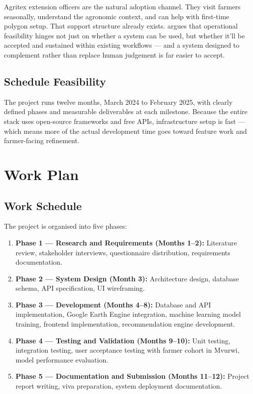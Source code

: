 \documentclass[12pt,a4paper]{report}
\begin{document}
Agritex extension officers are the natural adoption channel. They visit farmers seasonally, understand the agronomic context, and can help with first-time polygon setup. That support structure already exists. \citet{wieringa2014} argues that operational feasibility hinges not just on whether a system can be used, but whether it'll be accepted and sustained within existing workflows — and a system designed to complement rather than replace human judgement is far easier to accept.

\subsection{Schedule Feasibility}

The project runs twelve months, March 2024 to February 2025, with clearly defined phases and measurable deliverables at each milestone. Because the entire stack uses open-source frameworks and free APIs, infrastructure setup is fast — which means more of the actual development time goes toward feature work and farmer-facing refinement.

\section{Work Plan}

\subsection{Work Schedule}

The project is organised into five phases:

\begin{enumerate}
  \item \textbf{Phase 1 — Research and Requirements (Months 1--2):} Literature review, stakeholder interviews, questionnaire distribution, requirements documentation.
  \item \textbf{Phase 2 — System Design (Month 3):} Architecture design, database schema, API specification, UI wireframing.
  \item \textbf{Phase 3 — Development (Months 4--8):} Database and API implementation, Google Earth Engine integration, machine learning model training, frontend implementation, recommendation engine development.
  \item \textbf{Phase 4 — Testing and Validation (Months 9--10):} Unit testing, integration testing, user acceptance testing with farmer cohort in Mvurwi, model performance evaluation.
  \item \textbf{Phase 5 — Documentation and Submission (Months 11--12):} Project report writing, viva preparation, system deployment documentation.
\end{enumerate}
\end{document}
